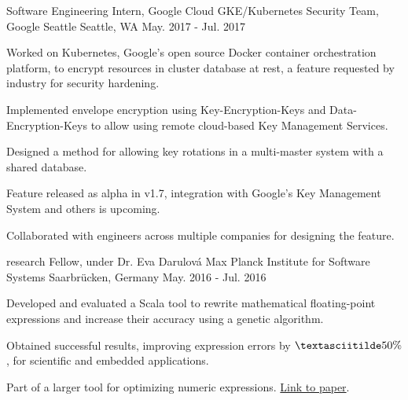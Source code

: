 
\vspace{-0.2cm}


\begin{cventries}


  \cventry
  {Software Engineering Intern, Google Cloud}
  {GKE/Kubernetes Security Team, Google Seattle}
  {Seattle, WA}
  {May. 2017 - Jul. 2017}
  {
    \begin{cvitems}
    \item {Worked on Kubernetes, Google's open source Docker container orchestration platform, to encrypt resources in cluster database at rest, a feature requested by industry for security hardening.}
    \item {Implemented envelope encryption using Key-Encryption-Keys and Data-Encryption-Keys to allow using remote cloud-based Key Management Services.}
    \item {Designed a method for allowing key rotations in a multi-master system with a shared database.}
    \item {Feature released as alpha in v1.7, integration with Google's Key Management System and others is upcoming.}
    \item {Collaborated with engineers across multiple companies for designing the feature.}
    \end{cvitems}
  }

  \cventry
  {research Fellow, under Dr. Eva Darulová} %
  {Max Planck Institute for Software Systems} %
  {Saarbrücken, Germany} %
  {May. 2016 - Jul. 2016} %
  {
    \begin{cvitems}
    \item {Developed and evaluated a Scala tool to rewrite
    mathematical floating-point expressions and increase their
    accuracy using a genetic algorithm.}
    \item {Obtained successful results, improving expression errors by
    $\textasciitilde50\%$, for scientific and embedded
    applications.}
    \item {Part of a larger tool for optimizing numeric expressions. \href{https://arxiv.org/abs/1707.02118}{Link to paper}}.
    \end{cvitems}
  }


\end{cventries}
